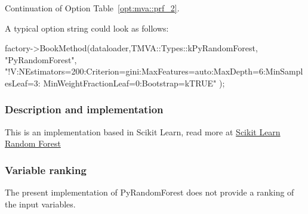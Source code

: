 \begin{option}[p]

\caption[.]{\optionCaptionSize 
     Continuation of Option Table~\ref{opt:mva::prf_2}.     
}
\label{opt:mva::prf_3}
\end{option}



A typical option string could look as follows:
\begin{codeexample}
\begin{tmvacode}
factory->BookMethod(dataloader,TMVA::Types::kPyRandomForest, "PyRandomForest",
"!V:NEstimators=200:Criterion=gini:MaxFeatures=auto:MaxDepth=6:MinSamplesLeaf=3:
MinWeightFractionLeaf=0:Bootstrap=kTRUE" );
\end{tmvacode}
\label{ce:PyRandomForestexample}
\end{codeexample}

\subsubsection{Description and implementation}
This is an implementation based in Scikit Learn,
read more at \href{http://scikit-learn.org/stable/modules/ensemble.html#forests-of-randomized-trees}{Scikit Learn Random Forest}

\subsubsection{Variable ranking}

The present implementation of PyRandomForest does not provide a ranking 
of the input variables.

% 


